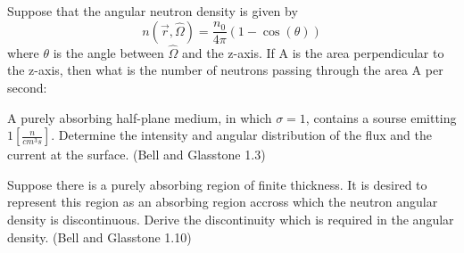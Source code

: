 \documentclass[12pts,answers]{exam}
\begin{document}
\begin{questions}
        \question Suppose that the angular neutron density is given by
        \begin{equation*}
            n(\vec{r},\hat{\Omega}) = \frac{n_0}{4\pi}(1-\cos(\theta))
        \end{equation*}
        where $\theta$ is the angle between $\hat{\Omega}$ and the z-axis. If A is the area perpendicular to the z-axis, then what is the number of neutrons passing through the area A per second:

        \pagebreak

        \question[40] A purely absorbing half-plane medium, in which $\sigma = 1$,
        contains a sourse emitting $1\left[\frac{n}{cm^3s}\right]$. Determine
                the intensity and angular distribution of the flux and the
                current at the surface. (Bell and Glasstone 1.3)
        \pagebreak

        \question[45] Suppose there is a purely absorbing region of finite
        thickness. It is desired to represent this region as an absorbing
        region accross which the neutron angular density is discontinuous.
        Derive the discontinuity which is required in the angular density.
        (Bell and Glasstone 1.10)

\end{questions}



%
%
\end{document}
